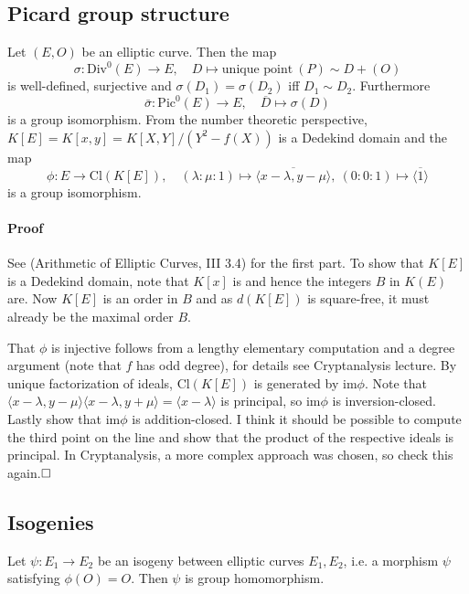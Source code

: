 \documentclass{scrartcl}
\begin{document}
\subsection{Picard group structure}
\label{elliptic_curve_group}
Let $(E, O)$ be an elliptic curve. Then the map
\begin{equation*}
    \sigma: \mathrm{Div}^0(E) \to E, \quad D \mapsto \text{unique point} \ (P) \sim D + (O) 
\end{equation*}
is well-defined, surjective and $\sigma(D_1) = \sigma(D_2)$ iff $D_1 \sim D_2$. Furthermore
\begin{equation*}
    \bar{\sigma}: \mathrm{Pic}^0(E) \to E, \quad \overline{D} \mapsto \sigma(D)
\end{equation*}
is a group isomorphism. From the number theoretic perspective, $K[E] = K[x, y] = K[X, Y] / (Y^2 - f(X))$ is a Dedekind domain and the map
\begin{equation*}
    \phi: E \to \mathrm{Cl}(K[E]), \quad (\lambda : \mu : 1) \mapsto \overline{\langle x - \lambda, y - \mu \rangle}, \ (0 : 0 : 1) \mapsto \overline{\langle 1 \rangle}
\end{equation*}
is a group isomorphism.

\paragraph{Proof} See (Arithmetic of Elliptic Curves, III 3.4) for the first part.
To show that $K[E]$ is a Dedekind domain, note that $K[x]$ is and hence the integers $B$ in $K(E)$ are.
Now $K[E]$ is an order in $B$ and as $d(K[E])$ is square-free, it must already be the maximal order $B$.

That $\phi$ is injective follows from a lengthy elementary computation and a degree argument (note that $f$ has odd degree), for details see Cryptanalysis lecture.
By unique factorization of ideals, $\mathrm{Cl}(K[E])$ is generated by $\mathrm{im}\phi$. 
Note that $\langle x - \lambda, y - \mu \rangle \langle x - \lambda, y + \mu \rangle = \langle x - \lambda \rangle$ is principal, so $\mathrm{im}\phi$ is inversion-closed.
Lastly show that $\mathrm{im}\phi$ is addition-closed. I think it should be possible to compute the third point on the line and show that the product of the respective ideals is principal.
In Cryptanalysis, a more complex approach was chosen, so check this again.$\hfill\square$

\subsection{Isogenies}
Let $\psi: E_1 \to E_2$ be an isogeny between elliptic curves $E_1, E_2$, i.e. a morphism $\psi$ satisfying $\phi(O) = O$. Then $\psi$ is group homomorphism.
\end{document}
